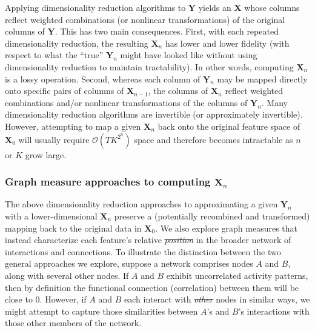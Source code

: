 \documentclass[english]{article}
\providecommand{\DIFaddtex}[1]{{\protect\color{blue}\uwave{#1}}} %
\providecommand{\DIFdeltex}[1]{{\protect\color{red}\sout{#1}}}                      %
\providecommand{\DIFaddbegin}{} %
\providecommand{\DIFaddend}{} %
\providecommand{\DIFdelbegin}{} %
\providecommand{\DIFdelend}{} %
\providecommand{\DIFadd}[1]{\texorpdfstring{\DIFaddtex{#1}}{#1}} %
\providecommand{\DIFdel}[1]{\texorpdfstring{\DIFdeltex{#1}}{}} %
\newcommand{\DIFscaledelfig}{0.5}
\newlength{\DIFdelgraphicswidth} %
\newlength{\DIFdelgraphicsheight} %
\newcommand{\DIFaddincludegraphics}[2][]{{\color{blue}\fbox{\DIFOincludegraphics[#1]{#2}}}} %
\newcommand{\DIFdelincludegraphics}[2][]{%
\sbox{\DIFdelgraphicsbox}{\DIFOincludegraphics[#1]{#2}}%
\settoboxwidth{\DIFdelgraphicswidth}{\DIFdelgraphicsbox} %
\settoboxtotalheight{\DIFdelgraphicsheight}{\DIFdelgraphicsbox} %
\scalebox{\DIFscaledelfig}{%
\parbox[b]{\DIFdelgraphicswidth}{\usebox{\DIFdelgraphicsbox}\\[-\baselineskip] \rule{\DIFdelgraphicswidth}{0em}}\llap{\resizebox{\DIFdelgraphicswidth}{\DIFdelgraphicsheight}{%
\setlength{\unitlength}{\DIFdelgraphicswidth}%
\begin{picture}(1,1)%
\thicklines\linethickness{2pt} %
{\color[rgb]{1,0,0}\put(0,0){\framebox(1,1){}}}%
{\color[rgb]{1,0,0}\put(0,0){\line( 1,1){1}}}%
{\color[rgb]{1,0,0}\put(0,1){\line(1,-1){1}}}%
\end{picture}%
}\hspace*{3pt}}} %
} %
\DeclareRobustCommand{\DIFaddbegin}{\DIFOaddbegin \let\includegraphics\DIFaddincludegraphics} %
\DeclareRobustCommand{\DIFaddend}{\DIFOaddend \let\includegraphics\DIFOincludegraphics} %
\DeclareRobustCommand{\DIFdelbegin}{\DIFOdelbegin \let\includegraphics\DIFdelincludegraphics} %
\DeclareRobustCommand{\DIFdelend}{\DIFOaddend \let\includegraphics\DIFOincludegraphics} %
\begin{document}
Applying dimensionality reduction algorithms to $\mathbf{Y}$ yields an
$\mathbf{X}$ whose columns reflect weighted combinations (or nonlinear
transformations) of the original columns of $\mathbf{Y}$.  This has
two main consequences.  First, with each repeated dimensionality
reduction, the resulting $\mathbf{X}_n$ has lower and lower fidelity
(with respect to what the ``true'' $\mathbf{Y}_n$ might have looked
like without using dimensionality reduction to maintain tractability).
In other words, computing $\mathbf{X}_n$ is a lossy operation.
Second, whereas each column of $\mathbf{Y}_n$ may be mapped
directly onto specific pairs of columns of $\mathbf{X}_{n-1}$, the
columns of $\mathbf{X}_n$ reflect weighted combinations and/or
nonlinear transformations of the columns of $\mathbf{Y}_n$.  Many
dimensionality reduction algorithms are invertible (or approximately
invertible).  However, attempting to map a given $\mathbf{X}_n$ back
onto the original feature space of $\mathbf{X}_0$ will usually require
$\mathcal{O}(TK^{2^n})$ space and therefore becomes intractable
as $n$ or $K$ grow large.

\subsubsection*{Graph measure approaches to computing
  $\mathbf{X}_n$}
The above dimensionality reduction approaches to approximating a given
$\mathbf{Y}_n$ with a lower-dimensional $\mathbf{X}_n$ preserve a
(potentially recombined and transformed) mapping back to the original
data in $\mathbf{X}_0$.  We also explore graph measures that instead
characterize each feature's relative \DIFdelbegin \textit{\DIFdel{position}} %
\DIFdelend \DIFaddbegin \DIFadd{position }\DIFaddend in the broader
network of interactions and connections.  To illustrate the
distinction between the two general approaches we explore, suppose a
network comprises nodes $A$ and $B$, along with several other nodes.  If $A$ and $B$ exhibit
uncorrelated activity patterns, then by definition the functional connection
(correlation) between them will be close to 0.
However, if $A$ and $B$ each interact with \DIFdelbegin \textit{\DIFdel{other}} %
\DIFdelend \DIFaddbegin \DIFadd{other }\DIFaddend nodes in similar ways, we
might attempt to capture those similarities between $A$'s and $B$'s
interactions with those other members of the network.
\end{document}
